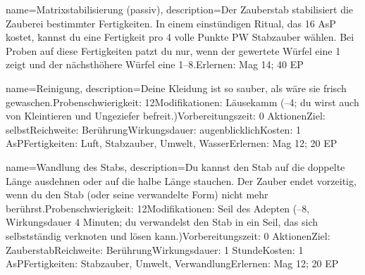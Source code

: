 {
    name={Matrixstabilisierung (passiv)},
    description={Der Zauberstab stabilisiert die Zauberei bestimmter Fertigkeiten. In einem einstündigen Ritual, das 16 AsP kostet, kannst du eine Fertigkeit pro 4 volle Punkte PW Stabzauber wählen. Bei Proben auf diese Fertigkeiten patzt du nur, wenn der gewertete Würfel eine 1 zeigt und der nächsthöhere Würfel eine 1–8.\newline Erlernen: Mag 14; 40 EP}
}


{
    name={Reinigung},
    description={Deine Kleidung ist so sauber, als wäre sie frisch gewaschen.\newline Probenschwierigkeit: 12\newline Modifikationen: Läusekamm (–4; du wirst auch von Kleintieren und Ungeziefer befreit.)\newline Vorbereitungszeit: 0 Aktionen\newline Ziel: selbst\newline Reichweite: Berührung\newline Wirkungsdauer: augenblicklich\newline Kosten: 1 AsP\newline Fertigkeiten: Luft, Stabzauber, Umwelt, Wasser\newline Erlernen: Mag 12; 20 EP}
}


{
    name={Wandlung des Stabs},
    description={Du kannst den Stab auf die doppelte Länge ausdehnen oder auf die halbe Länge stauchen. Der Zauber endet vorzeitig, wenn du den Stab (oder seine verwandelte Form) nicht mehr berührst.\newline Probenschwierigkeit: 12\newline Modifikationen: Seil des Adepten (–8, Wirkungsdauer 4 Minuten; du verwandelst den Stab in ein Seil, das sich selbstständig verknoten und lösen kann.)\newline Vorbereitungszeit: 0 Aktionen\newline Ziel: Zauberstab\newline Reichweite: Berührung\newline Wirkungsdauer: 1 Stunde\newline Kosten: 1 AsP\newline Fertigkeiten: Stabzauber, Umwelt, Verwandlung\newline Erlernen: Mag 12; 20 EP}
}


